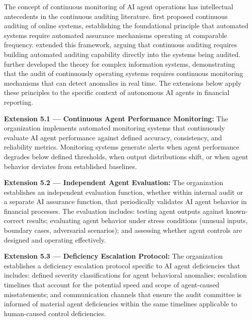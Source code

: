 \documentclass[12pt]{article}
\begin{document}
The concept of continuous monitoring of AI agent operations has intellectual antecedents in the continuous auditing literature. \citet{vasarhelyi1991} first proposed continuous auditing of online systems, establishing the foundational principle that automated systems require automated assurance mechanisms operating at comparable frequency. \citet{rezaee2002} extended this framework, arguing that continuous auditing requires building automated auditing capability directly into the systems being audited. \citet{alles2008} further developed the theory for complex information systems, demonstrating that the audit of continuously operating systems requires continuous monitoring mechanisms that can detect anomalies in real time. The extensions below apply these principles to the specific context of autonomous AI agents in financial reporting.

\begin{definitionbox}
\textbf{Extension 5.1 --- Continuous Agent Performance Monitoring:} The organization implements automated monitoring systems that continuously evaluate AI agent performance against defined accuracy, consistency, and reliability metrics. Monitoring systems generate alerts when agent performance degrades below defined thresholds, when output distributions shift, or when agent behavior deviates from established baselines.
\end{definitionbox}

\begin{definitionbox}
\textbf{Extension 5.2 --- Independent Agent Evaluation:} The organization establishes an independent evaluation function, whether within internal audit or a separate AI assurance function, that periodically validates AI agent behavior in financial processes. The evaluation includes: testing agent outputs against known-correct results; evaluating agent behavior under stress conditions (unusual inputs, boundary cases, adversarial scenarios); and assessing whether agent controls are designed and operating effectively.
\end{definitionbox}

\begin{definitionbox}
\textbf{Extension 5.3 --- Deficiency Escalation Protocol:} The organization establishes a deficiency escalation protocol specific to AI agent deficiencies that includes: defined severity classifications for agent behavioral anomalies; escalation timelines that account for the potential speed and scope of agent-caused misstatements; and communication channels that ensure the audit committee is informed of material agent deficiencies within the same timelines applicable to human-caused control deficiencies.
\end{definitionbox}


\clearpage


\end{document}
